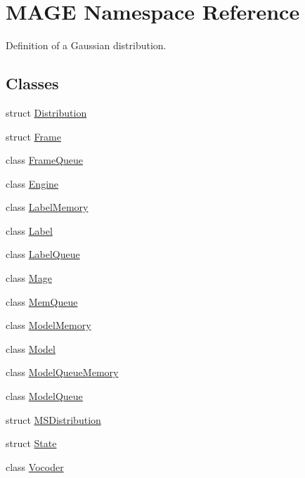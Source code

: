 \hypertarget{namespace_m_a_g_e}{\section{M\-A\-G\-E Namespace Reference}
\label{namespace_m_a_g_e}
}


Definition of a Gaussian distribution.  


\subsection*{Classes}
\begin{DoxyCompactItemize}
\item 
struct \hyperlink{struct_m_a_g_e_1_1_distribution}{Distribution}
\item 
struct \hyperlink{struct_m_a_g_e_1_1_frame}{Frame}
\item 
class \hyperlink{class_m_a_g_e_1_1_frame_queue}{Frame\-Queue}
\item 
class \hyperlink{class_m_a_g_e_1_1_engine}{Engine}
\item 
class \hyperlink{class_m_a_g_e_1_1_label_memory}{Label\-Memory}
\item 
class \hyperlink{class_m_a_g_e_1_1_label}{Label}
\item 
class \hyperlink{class_m_a_g_e_1_1_label_queue}{Label\-Queue}
\item 
class \hyperlink{class_m_a_g_e_1_1_mage}{Mage}
\item 
class \hyperlink{class_m_a_g_e_1_1_mem_queue}{Mem\-Queue}
\item 
class \hyperlink{class_m_a_g_e_1_1_model_memory}{Model\-Memory}
\item 
class \hyperlink{class_m_a_g_e_1_1_model}{Model}
\item 
class \hyperlink{class_m_a_g_e_1_1_model_queue_memory}{Model\-Queue\-Memory}
\item 
class \hyperlink{class_m_a_g_e_1_1_model_queue}{Model\-Queue}
\item 
struct \hyperlink{struct_m_a_g_e_1_1_m_s_distribution}{M\-S\-Distribution}
\item 
struct \hyperlink{struct_m_a_g_e_1_1_state}{State}
\item 
class \hyperlink{class_m_a_g_e_1_1_vocoder}{Vocoder}
\end{DoxyCompactItemize}
